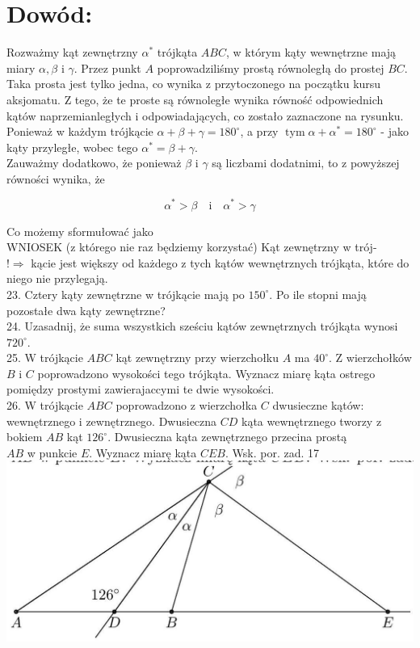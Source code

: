 \documentclass[10pt]{article}
\begin{document}
\section*{Dowód:}
Rozważmy kąt zewnętrzny \(\alpha^{*}\) trójkąta \(A B C\), w którym kąty wewnętrzne mają miary \(\alpha, \beta\) i \(\gamma\). Przez punkt \(A\) poprowadziliśmy prostą równoległą do prostej \(B C\). Taka prosta jest tylko jedna, co wynika z przytoczonego na początku kursu aksjomatu. Z tego, że te proste są równoległe wynika równość odpowiednich kątów naprzemianległych i odpowiadających, co zostało zaznaczone na rysunku. Ponieważ w każdym trójkącie \(\alpha+\beta+\gamma=180^{\circ}\), a przy \(\operatorname{tym} \alpha+\alpha^{*}=180^{\circ}\) - jako kąty przyległe, wobec tego \(\alpha^{*}=\beta+\gamma\).\\
Zauważmy dodatkowo, że ponieważ \(\beta\) i \(\gamma\) są liczbami dodatnimi, to z powyższej równości wynika, że

\[
\alpha^{*}>\beta \quad \mathrm{i} \quad \alpha^{*}>\gamma
\]

Co możemy sformułować jako\\
WNIOSEK (z którego nie raz będziemy korzystać) Kąt zewnętrzny w trój-\\
\(!\Rightarrow\) kącie jest większy od każdego z tych kątów wewnętrznych trójkąta, które do niego nie przylegają.\\
23. Cztery kąty zewnętrzne w trójkącie mają po \(150^{\circ}\). Po ile stopni mają pozostałe dwa kąty zewnętrzne?\\
24. Uzasadnij, że suma wszystkich sześciu kątów zewnętrznych trójkąta wynosi \(720^{\circ}\).\\
25. W trójkącie \(A B C\) kąt zewnętrzny przy wierzchołku \(A\) ma \(40^{\circ}\). Z wierzchołków \(B\) i \(C\) poprowadzono wysokości tego trójkąta. Wyznacz miarę kąta ostrego pomiędzy prostymi zawierajaccymi te dwie wysokości.\\
26. W trójkącie \(A B C\) poprowadzono z wierzchołka \(C\) dwusieczne kątów: wewnętrznego i zewnętrznego. Dwusieczna \(C D\) kąta wewnętrznego tworzy z bokiem \(A B\) kąt \(126^{\circ}\). Dwusieczna kąta zewnętrznego przecina prostą\\
\(A B\) w punkcie \(E\). Wyznacz miarę kąta \(C E B\). Wsk. por. zad. 17\\
\includegraphics[max width=\textwidth, center]{2024_11_21_71f62bd117d375398909g-023(1)}
\end{document}
